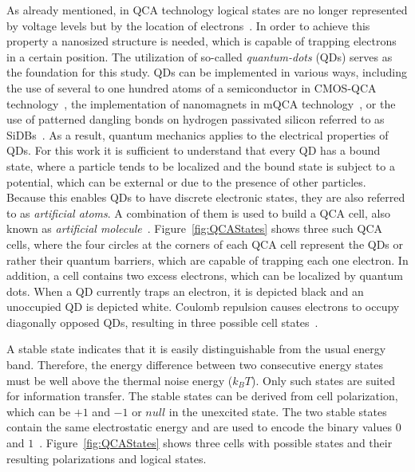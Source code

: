 As already mentioned, in QCA technology logical states are no longer represented by voltage levels but by the location of electrons~\cite{QCA_technology}. In order to achieve this property a nanosized structure is needed, which is capable of trapping electrons in a certain position. The utilization of so-called \emph{quantum-dots} (QDs) serves as the foundation for this study. QDs can be implemented in various ways, including the use of several to one hundred atoms of a semiconductor in CMOS-QCA technology~\cite{Quantum_dots}, the implementation of nanomagnets in mQCA technology~\cite{orlov2008magnetic}, or the use of patterned dangling bonds on hydrogen passivated silicon referred to as SiDBs~\cite{retallick2020population}. As a result, quantum mechanics applies to the electrical properties of QDs. For this work it is sufficient to understand that every QD has a bound state, where a particle tends to be localized and the bound state is subject to a potential, which can be external or due to the presence of other particles. Because this enables QDs to have discrete electronic states, they are also referred to as \textit{artificial atoms}. A combination of them is used to build a QCA cell, also known as \textit{artificial molecule}~\cite{Quantum_dots}. Figure~\ref{fig:QCAStates} shows three such QCA cells, where the four circles at the corners of each QCA cell represent the QDs or rather their quantum barriers, which are capable of trapping each one electron. In addition, a cell contains two excess electrons, which can be localized by quantum dots. When a QD currently traps an electron, it is depicted black and an unoccupied QD is depicted white. Coulomb repulsion causes electrons to occupy diagonally opposed QDs, resulting in three possible cell states~\cite{Sasamal2020QuantumDotCA, lent1997device, lent1994quantum}.

A stable state indicates that it is easily distinguishable from the usual energy band. Therefore, the energy difference between two consecutive energy states must be well above the thermal noise energy ($k_BT$). Only such states are suited for information transfer. The stable states can be derived from cell polarization, which can be $+1$ and $-1$ or $null$ in the unexcited state. The two stable states contain the same electrostatic energy and are used to encode the binary values $0$ and $1$~\cite{Sasamal2020QuantumDotCA}. Figure~\ref{fig:QCAStates} shows three cells with possible states and their resulting polarizations and logical states.

